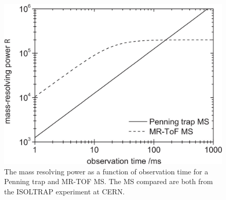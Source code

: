
\begin{figure}[H]
    \centering
    \includegraphics[width=.5\textwidth]{images/MS_PTMRTOF_graph.jpg}
    \caption{The mass resolving power as a function of observation time for a Penning trap and MR-TOF MS. The MS compared are both from the ISOLTRAP experiment at CERN.
    \cite{wolf_isoltraps_2013}}\label{fig:MSPTMRTOF}
\end{figure}
